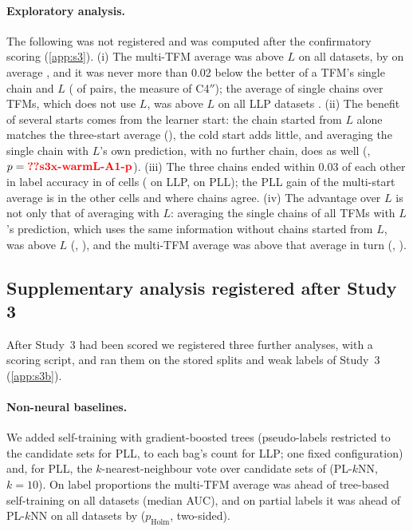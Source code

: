 \paragraph{Exploratory analysis.} The following was not registered and was computed after the confirmatory scoring
(\cref{app:s3}). (i) The multi-TFM average was above $L$ on all  datasets, by  on
average , and it was never more than 0.02 below the better of a TFM's single chain and $L$
( of  pairs, the measure of C4$''$); the
average of single chains over TFMs, which does not use $L$, was above $L$ on all  LLP datasets
. (ii) The benefit of several starts comes from the learner start:
the chain started from $L$ alone matches the three-start average (), the cold start adds little, and
averaging the single chain with $L$'s own prediction, with no further chain, does as well (,
$p=\val{s3x-warmL-A1-p}$). (iii) The three chains ended within 0.03 of each other in label accuracy in
 of cells ( on LLP,  on PLL); the PLL gain of the multi-start average is  in the other cells
and  where chains agree. (iv) The advantage over $L$ is not only that of averaging
with $L$: averaging the single chains of all TFMs with $L$'s prediction, which uses the same information without chains
started from $L$, was above $L$ (, ), and the multi-TFM average
was above that average in turn (, ).

\subsection{Supplementary analysis registered after Study 3}\label{sec:s3b}
After Study~3 had been scored we registered three further analyses, with a scoring script, and ran them on the stored
splits and weak labels of Study~3 (\cref{app:s3b}).

\paragraph{Non-neural baselines.} We added self-training with gradient-boosted trees (pseudo-labels restricted to the
candidate sets for PLL, to each bag's count for LLP; one fixed configuration) and, for PLL, the $k$-nearest-neighbour
vote over candidate sets of \citet{hullermeier2006plknn} (PL-$k$NN, $k=10$). On label proportions the multi-TFM average
was ahead of tree-based self-training on all  datasets (median  AUC),
and on partial labels it was ahead of PL-$k$NN on all  datasets by 
($p_{\mathrm{Holm}}$, two-sided).

